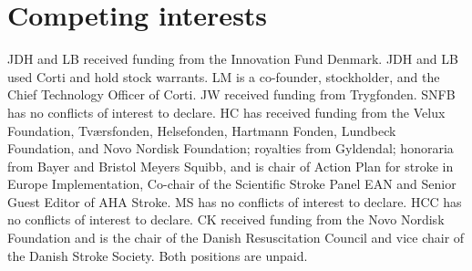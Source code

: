 {\section*{Competing interests}
JDH and LB received funding from the Innovation Fund Denmark. JDH and LB used Corti and hold stock warrants. LM is a co-founder, stockholder, and the Chief Technology Officer of Corti. JW received funding from Trygfonden. SNFB has no conflicts of interest to declare. HC has received funding from the Velux Foundation, Tværsfonden, Helsefonden, Hartmann Fonden, Lundbeck Foundation, and Novo Nordisk Foundation; royalties from Gyldendal; honoraria from Bayer and Bristol Meyers Squibb, and is chair of Action Plan for stroke in Europe Implementation, Co-chair of the Scientific Stroke Panel EAN and Senior Guest Editor of AHA Stroke. MS has no conflicts of interest to declare. HCC has no conflicts of interest to declare. CK received funding from the Novo Nordisk Foundation and is the chair of the Danish Resuscitation Council and vice chair of the Danish Stroke Society. Both positions are unpaid. 


}
